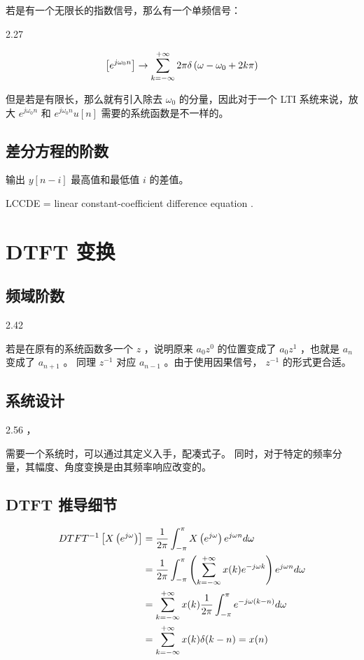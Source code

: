 \documentclass[cn,11pt,chinese,black,simple]{elegantbook}
\begin{document}
若是有一个无限长的指数信号，那么有一个单频信号：

2.27

\[
    \left[e^{j \omega_{0} n}\right]\rightarrow \displaystyle\sum_{k=-\infty}^{+\infty} 2 \pi \delta\left(\omega-\omega_{0}+2 k \pi\right)
\]

但是若是有限长，那么就有引入除去 \(\omega_0\) 的分量，因此对于一个 LTI 系统来说，放大 \(e^{j \omega_0 n}\) 和 \(e^{j \omega_0 n} u[n]\) 需要的系统函数是不一样的。

\section{差分方程的阶数}

输出 \(y[n-i]\) 最高值和最低值 \(i\) 的差值。

LCCDE = linear constant-coefficient difference equation .



\chapter{DTFT 变换}


\section{频域阶数}

2.42

若是在原有的系统函数多一个 \(z\) ，说明原来 \(a_0 z^0\) 的位置变成了 \(a_0 z^1\) ，也就是 \(a_n\) 变成了 \(a_{n+1}\) 。 同理 \(z^{-1}\) 对应 \(a_{n-1}\) 。由于使用因果信号， \(z^{-1}\) 的形式更合适。

\section{系统设计}

2.56 ，

需要一个系统时，可以通过其定义入手，配凑式子。 同时，对于特定的频率分量，其幅度、角度变换是由其频率响应改变的。

\section{DTFT 推导细节}

\[
\begin{aligned}
D T F T^{-1}\left[X\left(e^{j \omega}\right)\right]&=\dfrac{1}{2 \pi} \int_{-\pi}^{\pi} X\left(e^{j \omega}\right) e^{j \omega n} d \omega \\
&=\dfrac{1}{2 \pi} \int_{-\pi}^{\pi}\left(\displaystyle\sum_{k=-\infty}^{+\infty} x(k) e^{-j \omega k}\right) e^{j \omega n} d \omega \\
&=\displaystyle\sum_{k=-\infty}^{+\infty} x(k) \dfrac{1}{2 \pi} \int_{-\pi}^{\pi} e^{-j \omega(k-n)} d \omega\\
&=\displaystyle\sum_{k=-\infty}^{+\infty} x(k) \delta(k-n)=x(n)
\end{aligned}
\]
\end{document}
